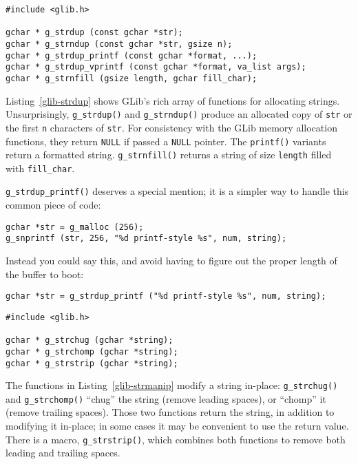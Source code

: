 \begin{lstlisting}[float, caption={Allocating Strings}, label=glib-strdup]
#include <glib.h>

gchar * g_strdup (const gchar *str);
gchar * g_strndup (const gchar *str, gsize n);
gchar * g_strdup_printf (const gchar *format, ...);
gchar * g_strdup_vprintf (const gchar *format, va_list args);
gchar * g_strnfill (gsize length, gchar fill_char);
\end{lstlisting}

Listing~\ref{glib-strdup} shows GLib's rich array of functions for allocating strings. Unsurprisingly, \lstinline{g_strdup()} and \lstinline{g_strndup()} produce an allocated copy of \lstinline{str} or the first \lstinline{n} characters of \lstinline{str}. For consistency with the GLib memory allocation functions, they return \lstinline{NULL} if passed a \lstinline{NULL} pointer. The \lstinline{printf()} variants return a formatted string. \lstinline{g_strnfill()} returns a string of size \lstinline{length} filled with \lstinline{fill_char}.

\lstinline{g_strdup_printf()} deserves a special mention; it is a simpler way to handle this common piece of code:
\begin{lstlisting}
gchar *str = g_malloc (256);
g_snprintf (str, 256, "%d printf-style %s", num, string);
\end{lstlisting}

Instead you could say this, and avoid having to figure out the proper length of the buffer to boot:
\begin{lstlisting}
gchar *str = g_strdup_printf ("%d printf-style %s", num, string);
\end{lstlisting}

\begin{lstlisting}[float, caption={In-place string modifications}, label=glib-strmanip]
#include <glib.h>

gchar * g_strchug (gchar *string);
gchar * g_strchomp (gchar *string);
gchar * g_strstrip (gchar *string);
\end{lstlisting}

The functions in Listing~\ref{glib-strmanip} modify a string in-place: \lstinline{g_strchug()} and \lstinline{g_strchomp()} ``chug'' the string (remove leading spaces), or ``chomp'' it (remove trailing spaces). Those two functions return the string, in addition to modifying it in-place; in some cases it may be convenient to use the return value. There is a macro, \lstinline{g_strstrip()}, which combines both functions to remove both leading and trailing spaces.

